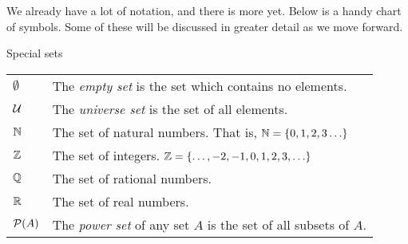 \documentclass[12pt]{article}
\begin{document}
We already have a lot of notation, and there is more yet.  Below is a handy chart of symbols.  Some of these will be discussed in greater detail as we move forward.

\begin{defbox}{Special sets}

\begin{tabular}{l p{5in}}
  $\emptyset$ & The \emph{empty set} is the set which contains no elements.\\[1ex]
  $\mathcal U$ & The \emph{universe set} is the set of all elements.\\[1ex]
$\mathbb N$ & The set of natural numbers. That is, $\mathbb N = \{0, 1, 2, 3\ldots\}$ \\[1ex]
$\mathbb Z$ & The set of integers.  $\mathbb Z = \{\ldots, -2, -1, 0, 1, 2, 3, \ldots\}$\\[1ex]
$\mathbb Q$ & The set of rational numbers.\\[1ex]
$\mathbb R$ & The set of real numbers.\\[1ex]
$\mathcal P(A)$ & The \emph{power set} of any set $A$ is the set of all subsets of $A$.
\end{tabular}
\end{defbox}

\newpage
\end{document}
